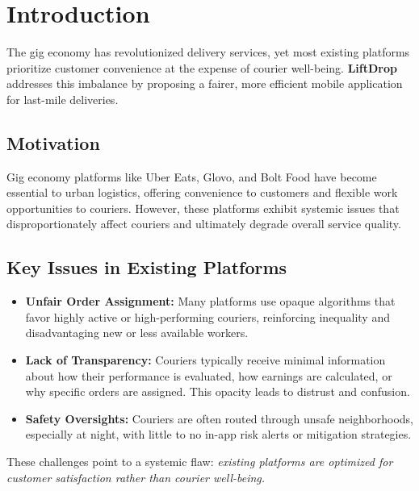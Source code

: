 \section{Introduction}

The gig economy has revolutionized delivery services, yet most existing platforms prioritize customer convenience at the expense of courier well-being. \textbf{LiftDrop} addresses this imbalance by proposing a fairer, more efficient mobile application for last-mile deliveries.

\vspace{3mm}

\subsection{Motivation}

Gig economy platforms like Uber Eats, Glovo, and Bolt Food have become essential to urban logistics, offering convenience to customers and flexible work opportunities to couriers. However, these platforms exhibit systemic issues that disproportionately affect couriers and ultimately degrade overall service quality.

\subsection*{Key Issues in Existing Platforms}

\begin{itemize}
    \item \textbf{Unfair Order Assignment:} Many platforms use opaque algorithms that favor highly active or high-performing couriers, reinforcing inequality and disadvantaging new or less available workers.
    
    \item \textbf{Lack of Transparency:} Couriers typically receive minimal information about how their performance is evaluated, how earnings are calculated, or why specific orders are assigned. This opacity leads to distrust and confusion.
    
    \item \textbf{Safety Oversights:} Couriers are often routed through unsafe neighborhoods, especially at night, with little to no in-app risk alerts or mitigation strategies.
\end{itemize}

These challenges point to a systemic flaw: \textit{existing platforms are optimized for customer satisfaction rather than courier well-being.}

